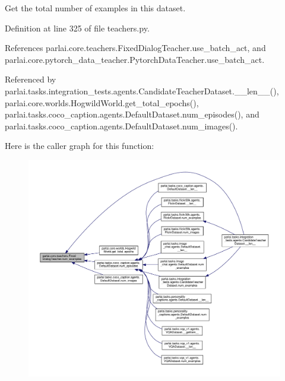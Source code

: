 \begin{DoxyVerb}Get the total number of examples in this dataset.\end{DoxyVerb}
 

Definition at line 325 of file teachers.\+py.



References parlai.\+core.\+teachers.\+Fixed\+Dialog\+Teacher.\+use\+\_\+batch\+\_\+act, and parlai.\+core.\+pytorch\+\_\+data\+\_\+teacher.\+Pytorch\+Data\+Teacher.\+use\+\_\+batch\+\_\+act.



Referenced by parlai.\+tasks.\+integration\+\_\+tests.\+agents.\+Candidate\+Teacher\+Dataset.\+\_\+\+\_\+len\+\_\+\+\_\+(), parlai.\+core.\+worlds.\+Hogwild\+World.\+get\+\_\+total\+\_\+epochs(), parlai.\+tasks.\+coco\+\_\+caption.\+agents.\+Default\+Dataset.\+num\+\_\+episodes(), and parlai.\+tasks.\+coco\+\_\+caption.\+agents.\+Default\+Dataset.\+num\+\_\+images().

Here is the caller graph for this function\+:
\nopagebreak
\begin{figure}[H]
\begin{center}
\leavevmode
\includegraphics[width=350pt]{classparlai_1_1core_1_1teachers_1_1FixedDialogTeacher_a38bd0d5c98506c45eb87d6db32d1c0bf_icgraph}
\end{center}
\end{figure}
\mbox{\label{classparlai_1_1core_1_1teachers_1_1FixedDialogTeacher_a32febe29909f7523b0d7b5ee7335fd05}} 
